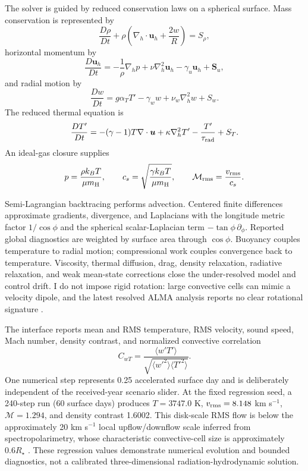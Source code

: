 \documentclass[11pt,a4paper]{article}
\begin{document}
The solver is guided by reduced conservation laws on a spherical surface. Mass conservation is represented by
\begin{equation}
\frac{D\rho}{Dt}+\rho\left(\nabla_h\cdot\bm{u}_h+\frac{2w}{R}\right)=S_\rho,
\end{equation}
horizontal momentum by
\begin{equation}
\frac{D\bm{u}_h}{Dt}=-\frac{1}{\rho}\nabla_h p
+\nu\nabla_h^2\bm{u}_h-\gamma_u\bm{u}_h+\bm{S}_u,
\end{equation}
and radial motion by
\begin{equation}
\frac{Dw}{Dt}=g\alpha_T T'-\gamma_w w+\nu_w\nabla_h^2w+S_w.
\end{equation}
The reduced thermal equation is
\begin{equation}
\frac{DT'}{Dt}=-(\gamma-1)T\nabla\cdot\bm{u}
+\kappa\nabla_h^2T'-\frac{T'}{\tau_{\rm rad}}+S_T.
\end{equation}
An ideal-gas closure supplies
\begin{equation}
p=\frac{\rho k_BT}{\mu m_{\rm H}},\qquad
c_s=\sqrt{\frac{\gamma k_BT}{\mu m_{\rm H}}},\qquad
\mathcal{M}_{\rm rms}=\frac{v_{\rm rms}}{c_s}.
\end{equation}

Semi-Lagrangian backtracing performs advection. Centered finite differences approximate gradients, divergence, and Laplacians with the longitude metric factor $1/\cos\phi$ and the spherical scalar-Laplacian term $-\tan\phi\,\partial_\phi$. Reported global diagnostics are weighted by surface area through $\cos\phi$. Buoyancy couples temperature to radial motion; compressional work couples convergence back to temperature. Viscosity, thermal diffusion, drag, density relaxation, radiative relaxation, and weak mean-state corrections close the under-resolved model and control drift. I do not impose rigid rotation: large convective cells can mimic a velocity dipole, and the latest resolved ALMA analysis reports no clear rotational signature \cite{ma2024,dent2026}.

The interface reports mean and RMS temperature, RMS velocity, sound speed, Mach number, density contrast, and normalized convective correlation
\begin{equation}
C_{wT}=\frac{\langle w'T'\rangle}
{\sqrt{\langle w'^2\rangle\langle T'^2\rangle}}.
\end{equation}
One numerical step represents 0.25 accelerated surface day and is deliberately independent of the received-year scenario slider. At the fixed regression seed, a 240-step run (60 surface days) produces $T=3747.0$ K, $v_{\rm rms}=8.148$ km s$^{-1}$, $\mathcal{M}=1.294$, and density contrast 1.6002. This disk-scale RMS flow is below the approximately 20 km s$^{-1}$ local upflow/downflow scale inferred from spectropolarimetry, whose characteristic convective-cell size is approximately $0.6R_\star$ \cite{lopezariste2018}. These regression values demonstrate numerical evolution and bounded diagnostics, not a calibrated three-dimensional radiation-hydrodynamic solution.
\end{document}
